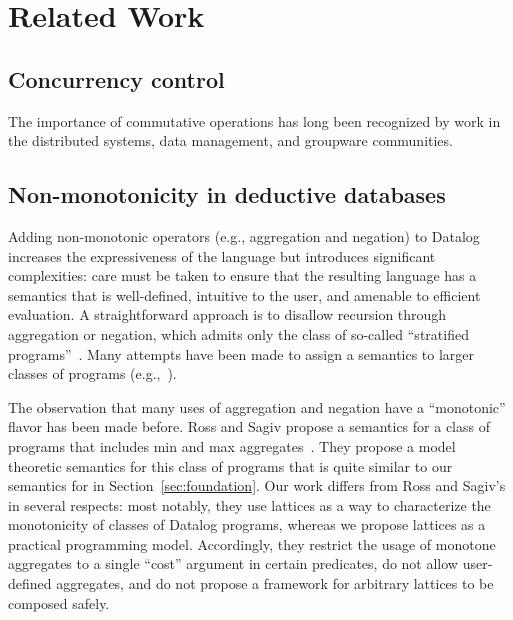 \section{Related Work}

\subsection{Concurrency control}
The importance of commutative operations has long been recognized by work in the
distributed systems, data management, and groupware communities.

\subsection{Non-monotonicity in deductive databases}
Adding non-monotonic operators (e.g., aggregation and negation) to Datalog
increases the expressiveness of the language but introduces significant
complexities: care must be taken to ensure that the resulting language has a
semantics that is well-defined, intuitive to the user, and amenable to efficient
evaluation. A straightforward approach is to disallow recursion through
aggregation or negation, which admits only the class of so-called ``stratified
programs''~\cite{Apt1988}. Many attempts have been made to assign a semantics to
larger classes of programs (e.g.,~\cite{Gelfond1988,Ross1990,VanGelder1991}).

The observation that many uses of aggregation and negation have a ``monotonic''
flavor has been made before. Ross and Sagiv propose a semantics for a class of
programs that includes min and max aggregates~\cite{Ross1992}. They propose a model theoretic
semantics for this class of programs that is quite similar to our semantics for
\baselang in Section~\ref{sec:foundation}. Our work differs from Ross and
Sagiv's in several respects: most notably, they use lattices as a way to
characterize the monotonicity of classes of Datalog programs, whereas we propose
lattices as a practical programming model. Accordingly, they restrict the usage
of monotone aggregates to a single ``cost'' argument in certain predicates, do
not allow user-defined aggregates, and do not propose a framework for arbitrary
lattices to be composed safely.

